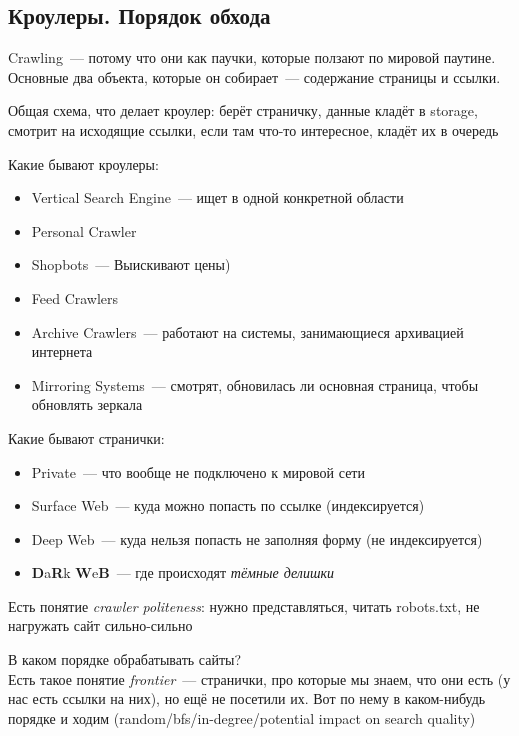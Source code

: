 \documentclass[12pt]{article}
\begin{document}
  \subsection{Кроулеры. Порядок обхода}
  Crawling~--- потому что они как паучки, которые ползают по мировой паутине.\\
  Основные два объекта, которые он собирает~--- содержание страницы и ссылки.

  Общая схема, что делает кроулер: берёт страничку, данные кладёт в storage, смотрит на исходящие ссылки, если там что-то интересное, кладёт их в очередь

  \smallskip\smallskip

  Какие бывают кроулеры:
    \begin{itemize}
      \item Vertical Search Engine~---
        ищет в одной конкретной области
      \item Personal Crawler
      \item Shopbots~---
        Выискивают цены)
      \item Feed Crawlers
      \item Archive Crawlers~--- 
        работают на системы, занимающиеся архивацией интернета
      \item Mirroring Systems~---
        смотрят, обновилась ли основная страница, чтобы обновлять зеркала
    \end{itemize}

  \smallskip\smallskip
  Какие бывают странички:
    \begin{itemize}
      \item Private~--- что вообще не подключено к мировой сети
      \item Surface Web~--- куда можно попасть по ссылке (индексируется)
      \item Deep Web~--- куда нельзя попасть не заполняя форму (не индексируется)
      \item {\bf D}a{\bf R}k {\bf W}e{\bf B}~--- где происходят \textit{тёмные делишки}
    \end{itemize}

  \smallskip\smallskip
  Есть понятие \textit{crawler politeness}: нужно представляться, читать robots.txt, не нагружать сайт сильно-сильно

  \smallskip
  В каком порядке обрабатывать сайты?\\
  Есть такое понятие \textit{frontier}~--- странички, про которые мы знаем, что они есть (у нас есть ссылки на них), но ещё не посетили их. Вот по нему в каком-нибудь порядке и ходим (random/bfs/in-degree/potential impact on search quality)
\end{document}
